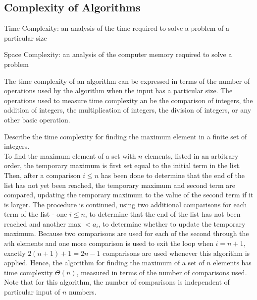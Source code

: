 \documentclass[12pt]{article}
\begin{document}
\subsection{Complexity of Algorithms}
\begin{definition} Time Complexity: an analysis of the time required to solve a problem of a particular size \end{definition} 
\begin{definition} Space Complexity: an analysis of the computer memory required to solve a problem \end{definition} 
The time complexity of an algorithm can be expressed in terms of the number of operations used by the algorithm when the input has a particular size. The operations used to measure time complexity an be the comparison of integers, the addition of integers, the multiplication of integers, the division of integers, or any other basic operation. 
\begin{example} Describe the time complexity for finding the maximum element in a finite set of integers. \\ To find the maximum element of a set with $n$ elements, listed in an arbitrary order, the temporary maximum is first set equal to the initial term in the list. Then, after a comparison $ i \leq n$ has been done to determine that the end of the list has not yet been reached, the temporary maximum and second term are compared, updating the temporary maximum to the value of the second term if it is larger. The procedure is continued, using two additional comparisons for each term of the list - one $ i \leq n$, to determine that the end of the list has not been reached and another max $< a_i$, to determine whether to update the temporary maximum. Because two comparisons are used for each of the second through the $n$th elements and one more comparison is used to exit the loop when $i = n + 1$, exactly $2(n + 1) + 1 = 2n - 1$ comparisons are used whenever this algorithm is applied. Hence, the algorithm for finding the maximum of a set of $n$ elements has time complexity $\Theta(n)$, measured in terms of the number of comparisons used. Note that for this algorithm, the number of comparisons is independent of particular input of $n$ numbers. \end{example} 
\end{document}
